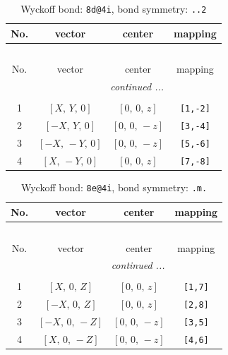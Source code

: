 \documentclass[fleqn,8pt]{jsarticle}
\begin{document}
\begin{longtable}{cccc}
\caption{Wyckoff bond: {\tt 8d@4i}, bond symmetry: {\tt ..2}}
 \\
 \hline \hline
No. & vector & center & mapping \\ \hline \endfirsthead

\multicolumn{3}{l}{\tablename\ \thetable{}} \\
 \hline \hline
No. & vector & center & mapping \\ \hline \endhead

 \hline \hline
\multicolumn{3}{r}{\footnotesize\it continued ...} \\ \endfoot

 \hline \hline
\multicolumn{3}{r}{} \\ \endlastfoot

1 & $\left[ X,\, Y,\, 0 \right]$ & $\left[ 0,\, 0,\, z \right]$ & {\tt [1,-2]} \\ \hline
2 & $\left[ - X,\, Y,\, 0 \right]$ & $\left[ 0,\, 0,\, - z \right]$ & {\tt [3,-4]} \\ \hline
3 & $\left[ - X,\, - Y,\, 0 \right]$ & $\left[ 0,\, 0,\, - z \right]$ & {\tt [5,-6]} \\ \hline
4 & $\left[ X,\, - Y,\, 0 \right]$ & $\left[ 0,\, 0,\, z \right]$ & {\tt [7,-8]} \\
\end{longtable}
\renewcommand{\arraystretch}{1.2}
\begin{longtable}{cccc}
\caption{Wyckoff bond: {\tt 8e@4i}, bond symmetry: {\tt .m.}}
 \\
 \hline \hline
No. & vector & center & mapping \\ \hline \endfirsthead

\multicolumn{3}{l}{\tablename\ \thetable{}} \\
 \hline \hline
No. & vector & center & mapping \\ \hline \endhead

 \hline \hline
\multicolumn{3}{r}{\footnotesize\it continued ...} \\ \endfoot

 \hline \hline
\multicolumn{3}{r}{} \\ \endlastfoot

1 & $\left[ X,\, 0,\, Z \right]$ & $\left[ 0,\, 0,\, z \right]$ & {\tt [1,7]} \\ \hline
2 & $\left[ - X,\, 0,\, Z \right]$ & $\left[ 0,\, 0,\, z \right]$ & {\tt [2,8]} \\ \hline
3 & $\left[ - X,\, 0,\, - Z \right]$ & $\left[ 0,\, 0,\, - z \right]$ & {\tt [3,5]} \\ \hline
4 & $\left[ X,\, 0,\, - Z \right]$ & $\left[ 0,\, 0,\, - z \right]$ & {\tt [4,6]} \\
\end{longtable}
\end{document}
